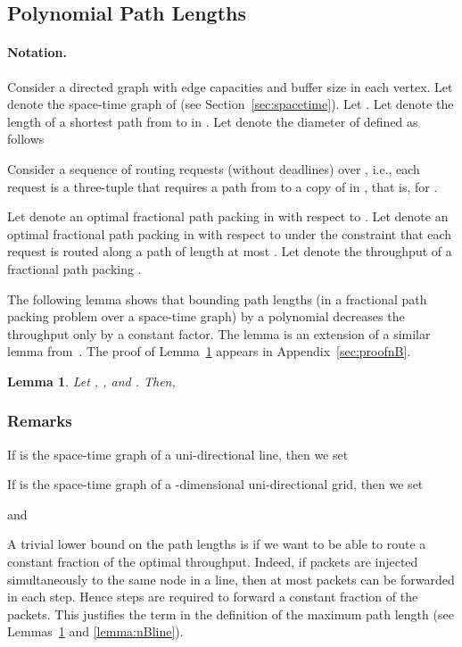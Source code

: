 \documentclass[11pt]{article}
\newtheorem{lemma}[theorem]{Lemma}
\newenvironment{proof sketch}[1]{\noindent {\emph{Proof sketch of #1:}}}{\hfill \qed}
\begin{document}
\subsection{Polynomial Path Lengths}
\paragraph{Notation.}
Consider a directed graph  with edge capacities  and
buffer size  in each vertex.  Let  denote the space-time
graph of  (see Section~\ref{sec:spacetime}).  Let .  Let
 denote the length of a shortest path from  to  in
. Let  denote the diameter of  defined as follows


Consider a sequence  of routing requests (without deadlines) over , i.e., each request is a three-tuple  that requires a path from  to a copy of  in , that is,  for .

Let  denote an optimal fractional path packing in  with respect to .
Let  denote an optimal fractional path packing in  with respect to  under the constraint that each request is routed along a path of length at most .
Let  denote the throughput of a fractional path packing .


The following lemma shows that bounding path lengths (in a fractional
path packing problem over a space-time graph) by a polynomial
decreases the throughput only by a constant factor.  The
lemma is an extension of a similar lemma from~\cite{AZ}.
The proof of Lemma~\ref{lemma:nB} appears in Appendix~\ref{sec:proofnB}.

\begin{lemma}\label{lemma:nB}
  Let , , and .  Then, 
\end{lemma}


\subsubsection{Remarks}
\begin{inparaenum}[(1)]
\item If  is the space-time graph of a
    uni-directional line, then we set  
\item If  is the space-time graph of a
    -dimensional uni-directional grid, then we set
    
    and 
\item
 A trivial lower bound on the path lengths is  if we want to be
  able to route a constant fraction of the optimal throughput. Indeed, if  packets
  are injected simultaneously to the same node in a line, then at most  packets
  can be forwarded in each step. Hence  steps are required to forward a
  constant fraction of the packets. This justifies the term  in the definition
  of the maximum path length (see Lemmas~\ref{lemma:nB} and \ref{lemma:nBline}).
\end{inparaenum}
\end{document}
